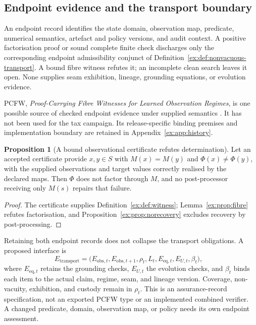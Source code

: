 \documentclass[11pt]{article}
\theoremstyle{definition}
\newtheorem{proposition}{Proposition}[section]
\begin{document}
\subsection{Endpoint evidence and the transport boundary}\label{ex:sec:pcfw}

An endpoint record identifies the state domain, observation map, predicate, numerical semantics, artefact and policy versions, and audit context. A positive factorisation proof or sound complete finite check discharges only the corresponding endpoint admissibility conjunct of Definition~\ref{ex:def:nonvacuous-transport}. A bound fibre witness refutes it; an incomplete clean search leaves it open. None supplies seam exhibition, lineage, grounding equations, or evolution evidence.

PCFW, \emph{Proof-Carrying Fibre Witnesses for Learned Observation Regimes}, is one possible source of checked endpoint evidence under supplied semantics \citep{moore2026pcfw}. It has not been used for the tax campaign. Its release-specific binding premises and implementation boundary are retained in Appendix~\ref{ex:app:history}.

\begin{proposition}[A bound observational certificate refutes determination]\label{ex:prop:pcfw-refutation}
Let an accepted certificate provide $x,y\in S$ with $M(x)=M(y)$ and $\Phi(x)\neq\Phi(y)$, with the supplied observations and target values correctly realised by the declared maps. Then $\Phi$ does not factor through $M$, and no post-processor receiving only $M(s)$ repairs that failure.
\end{proposition}
\begin{proof}
The certificate supplies Definition~\ref{ex:def:witness}; Lemma~\ref{ex:prop:fibre} refutes factorisation, and Proposition~\ref{ex:prop:norecovery} excludes recovery by post-processing.
\end{proof}

Retaining both endpoint records does not collapse the transport obligations. A proposed interface is
\begin{equation}\label{ex:eq:certificate-interface}
E_{\mathrm{transport}}=
\bigl(E_{\mathrm{obs},t},E_{\mathrm{obs},t+1},
\rho_t,L_t,E_{\mathrm{eq},t},E_{U,t},\beta_t\bigr),
\end{equation}
where $E_{\mathrm{eq},t}$ retains the grounding checks, $E_{U,t}$ the evolution checks, and $\beta_t$ binds each item to the actual claim, regime, seam, and lineage version. Coverage, non-vacuity, exhibition, and custody remain in $\rho_t$. This is an assurance-record specification, not an exported PCFW type or an implemented combined verifier. A changed predicate, domain, observation map, or policy needs its own endpoint assessment.
\end{document}
